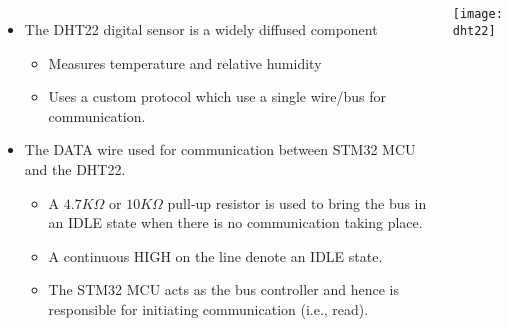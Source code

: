 \documentclass[aspectratio=169]{beamer}
\begin{document}
\begin{frame}{}
\begin{columns}

\begin{itemize}

\item The DHT22 digital sensor is a widely diffused component

\begin{itemize}

\item Measures temperature and relative humidity

\item Uses a custom protocol which use a single wire/bus for communication. 

\end{itemize}

\item<2> The DATA wire used for communication between STM32 MCU and the DHT22.

\begin{itemize}

\item A $4.7 K\Omega$ or $10 K\Omega$ pull-up resistor is used to bring the bus in an IDLE state when there is no communication taking place.

\item A continuous HIGH on the line denote an IDLE state.

\item The STM32 MCU acts as the bus controller and hence is responsible for initiating communication (i.e., read).

\end{itemize}

\end{itemize}

\centering
\texttt{[image: dht22]}
\vspace{1cm}

\end{columns}
\end{frame}
\end{document}
